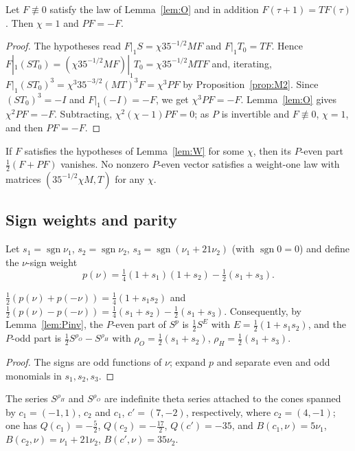\begin{lemma}\label{lem:W}
Let $F\not\equiv0$ satisfy the law of Lemma~\ref{lem:O} and in addition $F(\tau+1)=TF(\tau)$. Then $\chi=1$ and $PF=-F$.
\end{lemma}
\begin{proof}
The hypotheses read $F|_1S=\chi35^{-1/2}MF$ and $F|_1T_0=TF$. Hence $F|_1(ST_0)=(\chi35^{-1/2}MF)|_1T_0=\chi35^{-1/2}MTF$ and, iterating,
$F|_1(ST_0)^3=\chi^3 35^{-3/2}(MT)^3F=\chi^3PF$ by Proposition~\ref{prop:M2}. Since $(ST_0)^3=-I$ and $F|_1(-I)=-F$, we get $\chi^3PF=-F$. Lemma~\ref{lem:O} gives
$\chi^2PF=-F$. Subtracting, $\chi^2(\chi-1)PF=0$; as $P$ is invertible and $F\not\equiv0$, $\chi=1$, and then $PF=-F$.
\end{proof}

\begin{corollary}\label{cor:even}
If $F$ satisfies the hypotheses of Lemma~\ref{lem:W} for some $\chi$, then its $P$-even part $\frac12(F+PF)$ vanishes. No nonzero $P$-even vector satisfies a weight-one
law with matrices $(35^{-1/2}\chi M,T)$ for any $\chi$.
\end{corollary}

\subsection{Sign weights and parity}
Let $s_1=\operatorname{sgn}\nu_1$, $s_2=\operatorname{sgn}\nu_2$, $s_3=\operatorname{sgn}(\nu_1+21\nu_2)$ (with $\operatorname{sgn}0=0$) and define the $\nu$-sign weight
\[ p(\nu)=\tfrac14(1+s_1)(1+s_2)-\tfrac12(s_1+s_3). \]
\begin{lemma}\label{lem:psplit}
$\frac12(p(\nu)+p(-\nu))=\frac14(1+s_1s_2)$ and $\frac12(p(\nu)-p(-\nu))=\frac14(s_1+s_2)-\frac12(s_1+s_3)$. Consequently, by Lemma~\ref{lem:Pinv}, the $P$-even part of $S^p$ is
$\frac12S^{E}$ with $E=\frac12(1+s_1s_2)$, and the $P$-odd part is $\frac12S^{\rho_O}-S^{\rho_H}$ with $\rho_O=\frac12(s_1+s_2)$, $\rho_H=\frac12(s_1+s_3)$.
\end{lemma}
\begin{proof}
The signs are odd functions of $\nu$; expand $p$ and separate even and odd monomials in $s_1,s_2,s_3$.
\end{proof}
The series $S^{\rho_H}$ and $S^{\rho_O}$ are indefinite theta series attached to the cones spanned by $c_1=(-1,1)$, $c_2$ and $c_1$,
$c'=(7,-2)$, respectively, where $c_2=(4,-1)$; one has $Q(c_1)=-\frac52$, $Q(c_2)=-\frac{17}2$, $Q(c')=-35$, and $B(c_1,\nu)=5\nu_1$, $B(c_2,\nu)=\nu_1+21\nu_2$, $B(c',\nu)=35\nu_2$.

